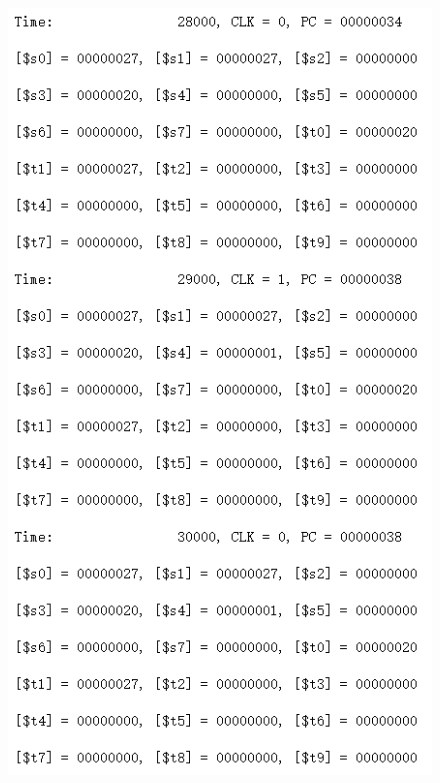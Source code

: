 \documentclass[12pt]{article}
\begin{document}
\begin{figure}[H]
\centering
\includegraphics[scale=1]{R10.jpg}
\end{figure}
\end{document}
